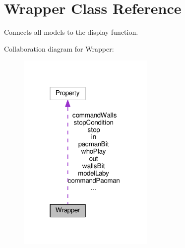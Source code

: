 \hypertarget{class_wrapper}{}\section{Wrapper Class Reference}
\label{class_wrapper}


Connects all models to the display function.  




Collaboration diagram for Wrapper\+:\nopagebreak
\begin{figure}[H]
\begin{center}
\leavevmode
\includegraphics[width=186pt]{class_wrapper__coll__graph}
\end{center}
\end{figure}
